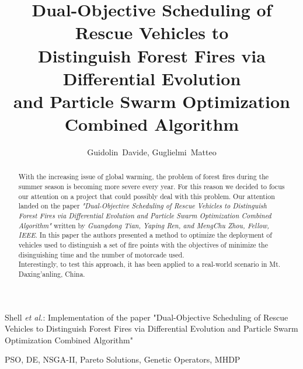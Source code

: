 \documentclass[journal]{IEEEtran}
\begin{document}

\title{Dual-Objective Scheduling of Rescue Vehicles to\\
Distinguish Forest Fires via Differential Evolution\\
and Particle Swarm Optimization\\
Combined Algorithm}

\author{Guidolin~Davide,
        Guglielmi~Matteo}%

%
{Shell \MakeLowercase{\textit{et al.}}: Implementation of the paper "Dual-Objective Scheduling of Rescue Vehicles to 
Distinguish Forest Fires via Differential Evolution
and Particle Swarm Optimization
Combined Algorithm"}
\maketitle

\begin{abstract}
With the increasing issue of global warming, the problem of forest fires during the summer season is becoming more severe every year.
For this reason we decided to focus our attention on a project that could possibly deal with this problem. Our attention landed on the paper 
\textit{"Dual-Objective Scheduling of Rescue Vehicles to Distinguish Forest Fires via Differential Evolution and Particle Swarm Optimization Combined Algorithm"}
written by \textit{Guangdong Tian, Yaping Ren, and MengChu Zhou, Fellow, IEEE}. 
In this paper the authors presented a method to optimize the deployment of vehicles used to distinguish a set of fire points with the objectives of minimize the disinguishing time and the number of motorcade used. \\
Interestingly, to test this approach, it has been applied to a real-world scenario in Mt. Daxing’anling, China.\\
\end{abstract}

\begin{IEEEkeywords}
    PSO, DE, NSGA-II, Pareto Solutions, Genetic Operators, MHDP
\end{IEEEkeywords}

\IEEEpeerreviewmaketitle









\end{document}
